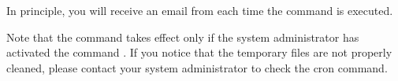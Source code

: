 \documentclass[12pt,a4paper, twoside]{scrreprt} %
\begin{document}
In principle, you will receive an email from  each
time the command is executed.

Note that the command  takes effect only if the
system administrator has activated the command . If you
notice that the temporary files are not properly cleaned, please
contact your system administrator to check the cron command.
\end{document}
